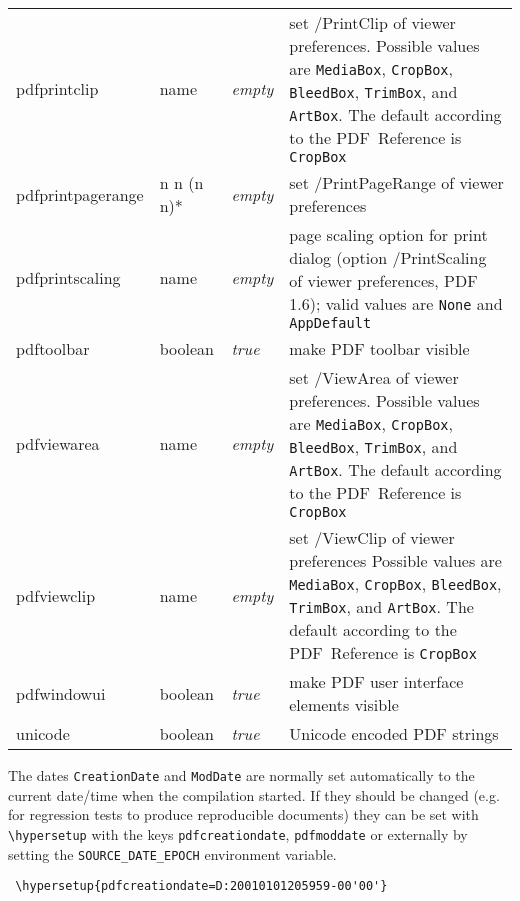 \documentclass{article}
\begin{document}
\begin{longtable}{@{}>{\ttfamily}l>{\raggedright}p{}>{\itshape}lp{7cm}@{}}
pdfprintclip       & name    & empty & set /PrintClip of viewer preferences.  Possible values are
                                       \verb|MediaBox|, \verb|CropBox|,
                                       \verb|BleedBox|, \verb|TrimBox|, and \verb|ArtBox|.
                                       The default according to the PDF~Reference is \verb|CropBox| \\
pdfprintpagerange  & n n (n n)*
                             & empty & set /PrintPageRange of viewer preferences\\
pdfprintscaling    & name    & empty & page scaling option for print dialog
                                       (option /PrintScaling of viewer
                                       preferences, PDF 1.6);
                                       valid values are \verb|None| and
                                       \verb|AppDefault| \\
pdftoolbar         & boolean & true  & make PDF toolbar visible \\
pdfviewarea        & name    & empty & set /ViewArea of viewer preferences. Possible values are
                                       \verb|MediaBox|, \verb|CropBox|,
                                       \verb|BleedBox|, \verb|TrimBox|, and \verb|ArtBox|.
                                       The default according to the PDF~Reference is \verb|CropBox| \\
pdfviewclip        & name    & empty & set /ViewClip of viewer preferences Possible values are
                                       \verb|MediaBox|, \verb|CropBox|,
                                       \verb|BleedBox|, \verb|TrimBox|, and \verb|ArtBox|.
                                       The default according to the PDF~Reference is \verb|CropBox| \\
pdfwindowui        & boolean & true  & make PDF user interface elements visible \\
unicode            & boolean & true & Unicode encoded PDF strings
\end{longtable}

 The dates \verb|CreationDate| and \verb|ModDate| 
 are normally set automatically to the current date/time when the compilation
 started. If they should be changed
 (e.g. for regression tests to produce reproducible documents) they can
 be set with \verb|\hypersetup| with the keys
 \verb|pdfcreationdate|, \verb|pdfmoddate| or externally by setting the \verb|SOURCE_DATE_EPOCH| environment variable. 

 \begin{verbatim}
 \hypersetup{pdfcreationdate=D:20010101205959-00'00'}
 \end{verbatim}
\end{document}
